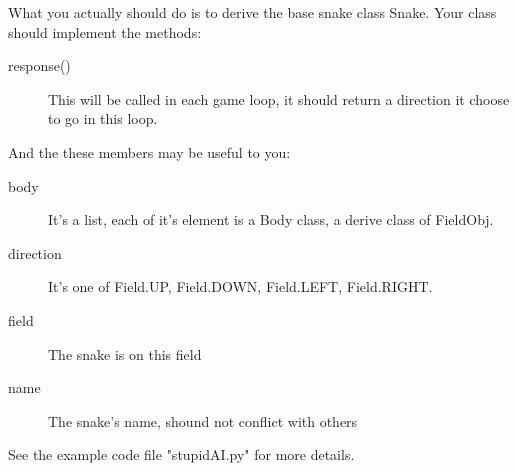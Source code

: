\documentclass[11pt,a4paper]{article}
\begin{document}
What you actually should do is to derive the base snake class Snake.
Your class should implement the methods:
\begin{description}
	\item[response()] This will be called in each game loop, it should return a direction it choose to go in this loop.
\end{description}

And the these members may be useful to you:
\begin{description}
	\item[body] It's a list, each of it's element is a Body class, a derive class of FieldObj.
	\item[direction] It's one of Field.UP, Field.DOWN, Field.LEFT, Field.RIGHT.
	\item[field] The snake is on this field
	\item[name] The snake's name, shound not conflict with others
\end{description}
See the example code file "stupidAI.py" for more details.
\end{document}
